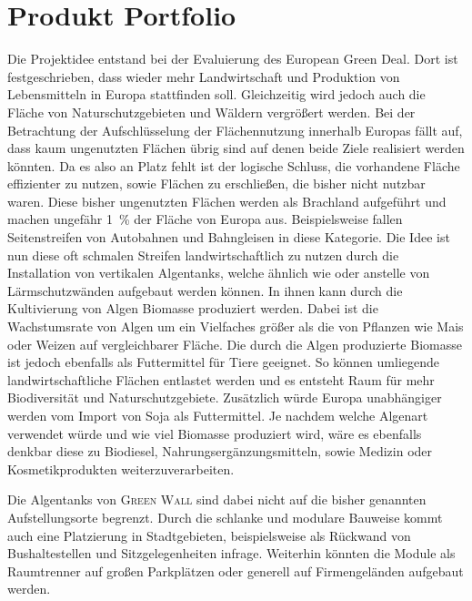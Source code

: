 \section{Produkt Portfolio}
    Die Projektidee entstand bei der Evaluierung des European Green Deal.
    Dort ist festgeschrieben, dass wieder mehr Landwirtschaft und Produktion von Lebensmitteln in Europa stattfinden soll.
    Gleichzeitig wird jedoch auch die Fläche von Naturschutzgebieten und Wäldern vergrößert werden.
    Bei der Betrachtung der Aufschlüsselung der Flächennutzung innerhalb Europas fällt auf, dass kaum ungenutzten Flächen übrig sind auf denen beide Ziele realisiert werden könnten.
    Da es also an Platz fehlt ist der logische Schluss, die vorhandene Fläche effizienter zu nutzen, sowie Flächen zu erschließen, die bisher nicht nutzbar waren.
    Diese bisher ungenutzten Flächen werden als Brachland aufgeführt und machen ungefähr \qty{1}{\percent} der Fläche von Europa aus.
    Beispielsweise fallen Seitenstreifen von Autobahnen und Bahngleisen in diese Kategorie.
    Die Idee ist nun diese oft schmalen Streifen landwirtschaftlich zu nutzen durch die Installation von vertikalen Algentanks, welche ähnlich wie oder anstelle von Lärmschutzwänden aufgebaut werden können.
    In ihnen kann durch die Kultivierung von Algen Biomasse produziert werden.
    Dabei ist die Wachstumsrate von Algen um ein Vielfaches größer als die von Pflanzen wie Mais oder Weizen auf vergleichbarer Fläche.
    Die durch die Algen produzierte Biomasse ist jedoch ebenfalls als Futtermittel für Tiere geeignet.
    So können umliegende landwirtschaftliche Flächen entlastet werden und es entsteht Raum für mehr Biodiversität und Naturschutzgebiete.
    Zusätzlich würde Europa unabhängiger werden vom Import von Soja als Futtermittel.
    Je nachdem welche Algenart verwendet würde und wie viel Biomasse produziert wird, wäre es ebenfalls denkbar diese zu Biodiesel, Nahrungsergänzungsmitteln, sowie Medizin oder Kosmetikprodukten weiterzuverarbeiten.\par\medskip
    
    Die Algentanks von \textsc{Green Wall} sind dabei nicht auf die bisher genannten Aufstellungsorte begrenzt.
    Durch die schlanke und modulare Bauweise kommt auch eine Platzierung in Stadtgebieten, beispielsweise als Rückwand von Bushaltestellen und Sitzgelegenheiten infrage.
    Weiterhin könnten die Module als Raumtrenner auf großen Parkplätzen oder generell auf Firmengeländen aufgebaut werden.\par\medskip

